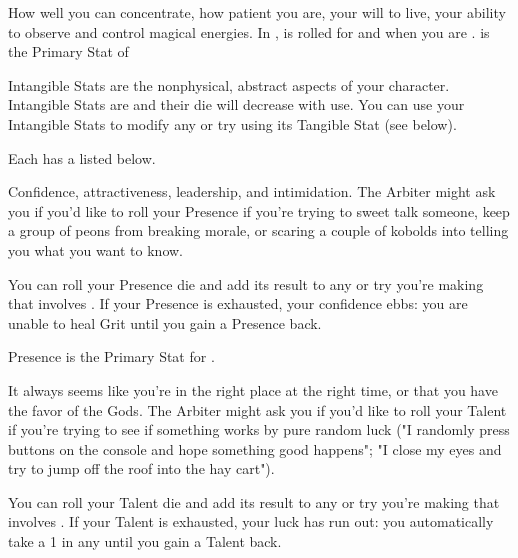 {

How well you can concentrate, how patient you are, your will to live, your ability to observe and control magical energies.  In , \FOC is rolled for  and when you are .  \FOC is the Primary Stat of 

\cbreak




Intangible Stats are the nonphysical, abstract aspects of your character. Intangible Stats are \UD and their die will decrease with use.  You can use your Intangible Stats to modify any \RO or \RB try using its  Tangible Stat (see below).

Each  has a  listed below.



Confidence, attractiveness, leadership, and intimidation. The Arbiter might ask you if you'd like to roll your Presence \UD if you're trying to sweet talk someone, keep a group of peons from breaking morale, or scaring a couple of kobolds into telling you what you want to know. 

You can roll your Presence die and add its result to any \RO or \RB try you're making that involves \VIG.  If your Presence is exhausted, your confidence ebbs: you are unable to heal Grit until you gain a Presence \UD back.

Presence is the Primary Stat for .



It always seems like you're in the right place at the right time, or that you have the favor of the Gods. The Arbiter might ask you if you'd like to roll your Talent \UD if you're trying to see if something works by pure random luck ("I randomly press buttons on the console and hope something good happens"; "I close my eyes and try to jump off the roof into the hay cart").  

You can roll your Talent die and add its result to any \RO or \RB try you're making that involves \DEX.  If your Talent is exhausted, your luck has run out: you automatically take a 1 in any  until you gain a Talent \UD back.

}
